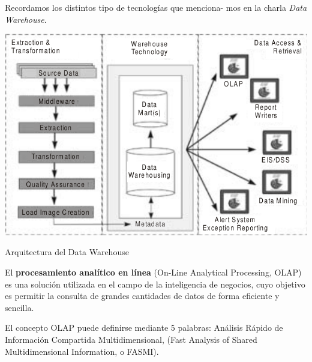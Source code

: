 \documentclass{fancyslides}
\begin{document}
\startingslide %


\begin{frame}
\end{frame}

\begin{frame}
\misc
{
Recordamos los distintos tipo de tecnologías que menciona- mos en la charla \textit{Data Warehouse}.

  \begin{center}
  \includegraphics[scale=0.25]{arquitectura}
  
  Arquitectura del Data Warehouse
  \end{center}
}
\end{frame}

\begin{frame}
\end{frame}


\begin{frame}
\misc
{
El \textbf{procesamiento analítico en línea} (On-Line Analytical Processing, OLAP) es una solución utilizada en el campo de la inteligencia de negocios, cuyo objetivo es permitir la consulta de grandes cantidades de datos de forma eficiente y sencilla.
}
\end{frame}

\begin{frame}
\misc
{
El concepto OLAP puede definirse mediante 5 palabras: Análisis Rápido de Información Compartida Multidimensional, (Fast Analysis of Shared Multidimensional Information, o FASMI).
}
\end{frame}
\end{document}
